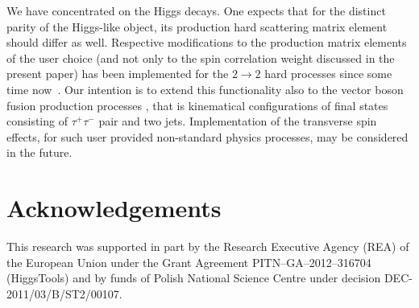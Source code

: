 \documentclass[12pt]{article}
\begin{document}
We have concentrated on the Higgs decays. One expects that for the distinct parity of the Higgs-like object,
its production hard scattering matrix element should differ as well.
Respective modifications to the production matrix elements of the user choice
(and not only to the spin correlation weight discussed in the present paper) 
has been  implemented  for the $2 \to 2$ hard processes
since some time now~\cite{Banerjee:2012ez}. 
Our intention is to extend this functionality also to the 
vector boson fusion production processes \cite{Kalinowski:2014}, 
that is  kinematical configurations
of final states consisting of $\tau^+\tau^-$ pair and two jets. 
Implementation of the transverse spin effects, for such user provided 
non-standard physics processes, may be considered in the future.

  



\section*{Acknowledgements}

This research was supported in part by
the Research Executive Agency (REA) of the European Union under
the Grant Agreement PITN–GA–2012–316704 (HiggsTools) and by funds of Polish National Science
Centre under decision DEC-2011/03/B/ST2/00107.
\end{document}
